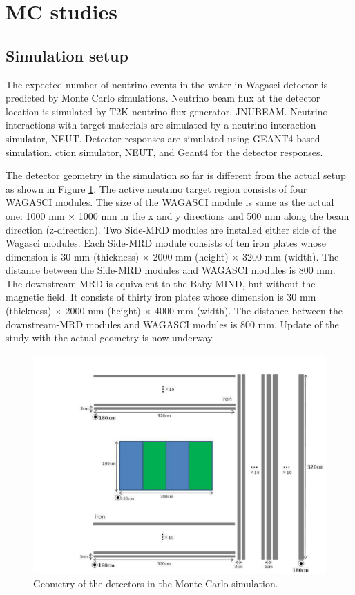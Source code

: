 \section{MC studies}
\label{sec:mc_study}
\subsection{Simulation setup}

The expected number of neutrino events in the water-in Wagasci detector
is predicted by Monte Carlo simulations.
Neutrino beam flux at the detector location is simulated by T2K neutrino flux generator, JNUBEAM. Neutrino interactions with target materials are simulated by a neutrino interaction simulator, NEUT. Detector responses are simulated using GEANT4-based simulation.
ction simulator, NEUT, and Geant4 for the detector responses.


The detector geometry in the simulation so far is different from the actual setup as shown in Figure \ref{fig:wagasci_mc_geometry}.
The active neutrino target region consists of four WAGASCI modules.
The size of the WAGASCI module is same as the actual one: 1000 mm $\times$ 1000 mm in the x and y directions and 500 mm along the beam direction (z-direction).
Two Side-MRD modules are installed either side of the Wagasci modules.
Each Side-MRD module consists of ten iron plates whose dimension is 30 mm (thickness) $\times$ 2000 mm (height) $\times$ 3200 mm (width). 
The distance between the Side-MRD modules and WAGASCI modules is 800 mm.
The downstream-MRD is equivalent to the Baby-MIND, but without the magnetic field.
It consists of thirty iron plates whose dimension is  30 mm (thickness) $\times$ 2000 mm (height) $\times$ 4000 mm (width).
The distance between the downstream-MRD modules and WAGASCI modules is 800 mm.
Update of the study with the actual geometry is now underway.

\begin{figure}[tbhp]
\begin{center}
\includegraphics[width=0.8\linewidth]{fig/wagasci_mc_geometry.pdf}
\end{center}
\caption{
Geometry of the detectors in the Monte Carlo simulation.}
\label{fig:wagasci_mc_geometry}
\end{figure}

